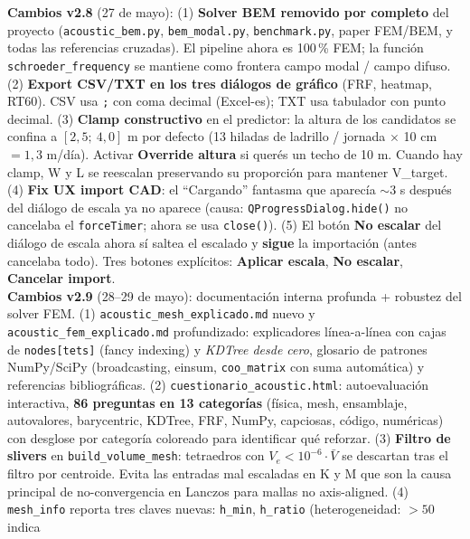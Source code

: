 \documentclass[11pt, a4paper]{article}
\newcommand{\menu}[1]{\textbf{\guillemotleft #1\guillemotright}}
\begin{document}
\begin{center}
{    \textbf{Cambios v2.8} (27 de mayo):
    (1) \textbf{Solver BEM removido por completo} del proyecto
    (\texttt{acoustic\_bem.py}, \texttt{bem\_modal.py},
    \texttt{benchmark.py}, paper FEM/BEM, y todas las referencias
    cruzadas). El pipeline ahora es 100\,\% FEM; la función
    \texttt{schroeder\_frequency} se mantiene como frontera campo modal
    / campo difuso.
    (2) \textbf{Export CSV/TXT en los tres diálogos de gráfico}
    (FRF, heatmap, RT60). CSV usa \texttt{;} con coma decimal (Excel-es);
    TXT usa tabulador con punto decimal.
    (3) \textbf{Clamp constructivo} en el predictor: la altura de los
    candidatos se confina a $[2{,}5;\ 4{,}0]$ m por defecto (13 hiladas
    de ladrillo / jornada $\times$ 10 cm $= 1{,}3$ m/día). Activar
    \menu{Override altura} si querés un techo de 10 m. Cuando hay clamp,
    W y L se reescalan preservando su proporción para mantener V\_target.
    (4) \textbf{Fix UX import CAD}: el ``Cargando'' fantasma que
    aparecía $\sim 3$ s después del diálogo de escala ya no aparece
    (causa: \texttt{QProgressDialog.hide()} no cancelaba el
    \texttt{forceTimer}; ahora se usa \texttt{close()}).
    (5) El botón \menu{No escalar} del diálogo de escala ahora sí
    saltea el escalado y \textbf{sigue} la importación (antes
    cancelaba todo). Tres botones explícitos: \menu{Aplicar escala},
    \menu{No escalar}, \menu{Cancelar import}.\\[2pt]
    \textbf{Cambios v2.9} (28--29 de mayo): documentación interna
    profunda + robustez del solver FEM.
    (1) \texttt{acoustic\_mesh\_explicado.md} nuevo y
    \texttt{acoustic\_fem\_explicado.md} profundizado: explicadores
    línea-a-línea con cajas de \texttt{nodes[tets]} (fancy indexing)
    y \emph{KDTree desde cero}, glosario de patrones NumPy/SciPy
    (broadcasting, einsum, \texttt{coo\_matrix} con suma automática)
    y referencias bibliográficas.
    (2) \texttt{cuestionario\_acoustic.html}: autoevaluación
    interactiva, \textbf{86 preguntas en 13 categorías}
    (física, mesh, ensamblaje, autovalores, barycentric, KDTree, FRF,
    NumPy, capciosas, código, numéricas) con desglose por categoría
    coloreado para identificar qué reforzar.
    (3) \textbf{Filtro de slivers} en \texttt{build\_volume\_mesh}:
    tetraedros con $V_e < 10^{-6} \cdot \bar V$ se descartan tras el
    filtro por centroide. Evita las entradas mal escaladas en K y M
    que son la causa principal de no-convergencia en Lanczos para
    mallas no axis-aligned.
    (4) \texttt{mesh\_info} reporta tres claves nuevas:
    \texttt{h\_min}, \texttt{h\_ratio} (heterogeneidad: $> 50$ indica
}
\end{center}
\end{document}
